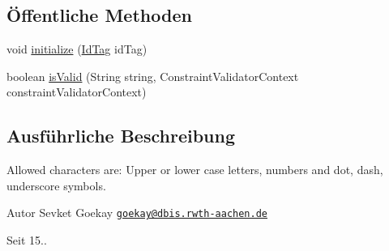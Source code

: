 \subsection*{Öffentliche Methoden}
\begin{DoxyCompactItemize}
\item 
void \hyperlink{classde_1_1rwth_1_1idsg_1_1steve_1_1web_1_1validation_1_1_id_tag_validator_a027044d6b6433adce002c3d1959150b4}{initialize} (\hyperlink{interfacede_1_1rwth_1_1idsg_1_1steve_1_1web_1_1validation_1_1_id_tag}{Id\-Tag} id\-Tag)
\item 
boolean \hyperlink{classde_1_1rwth_1_1idsg_1_1steve_1_1web_1_1validation_1_1_id_tag_validator_af462861b25067836951b7e0651a1fce7}{is\-Valid} (String string, Constraint\-Validator\-Context constraint\-Validator\-Context)
\end{DoxyCompactItemize}


\subsection{Ausführliche Beschreibung}
Allowed characters are\-: Upper or lower case letters, numbers and dot, dash, underscore symbols.

\begin{DoxyAuthor}{Autor}
Sevket Goekay \href{mailto:goekay@dbis.rwth-aachen.de}{\tt goekay@dbis.\-rwth-\/aachen.\-de} 
\end{DoxyAuthor}
\begin{DoxySince}{Seit}
15.. 
\end{DoxySince}


